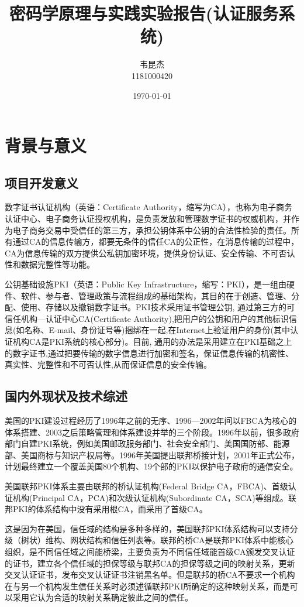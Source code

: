 \documentclass{ctexart}
\title{密码学原理与实践实验报告(认证服务系统)}
\author{韦昆杰\\1181000420}
\date{\today}
\begin{document}
\maketitle

\tableofcontents
\section{背景与意义}
\subsection{项目开发意义}
数字证书认证机构（英语：Certificate Authority，缩写为CA），也称为电子商务认证中心、电子商务认证授权机构，是负责发放和管理数字证书的权威机构，并作为电子商务交易中受信任的第三方，承担公钥体系中公钥的合法性检验的责任。所有通过CA的信息传输方，都要无条件的信任CA的公正性，在消息传输的过程中，CA为信息传输的双方提供公私钥加密环境，提供身份认证、安全传输、不可否认性和数据完整性等功能。

公钥基础设施PKI（英语：Public Key Infrastructure，缩写：PKI），是一组由硬件、软件、参与者、管理政策与流程组成的基础架构，其目的在于创造、管理、分配、使用、存储以及撤销数字证书。PKI技术采用证书管理公钥, 通过第三方的可信任机构—认证中心CA(Certificate Authority),把用户的公钥和用户的其他标识信息(如名称、E-mail、身份证号等)捆绑在一起,在Internet上验证用户的身份(其中认证机构CA是PKI系统的核心部分)。目前, 通用的办法是采用建立在PKI基础之上的数字证书,通过把要传输的数字信息进行加密和签名，保证信息传输的机密性、真实性、完整性和不可否认性,从而保证信息的安全传输。
\subsection{国内外现状及技术综述}
美国的PKI建设过程经历了1996年之前的无序、1996—2002年间以FBCA为核心的体系搭建、2003之后策略管理和体系建设并举的三个阶段。1996年以前，很多政府部门自建PKI系统，例如美国邮政服务部门、社会安全部门、美国国防部、能源部、美国商标与知识产权局等。1996年美国提出联邦桥接计划，2001年正式公布，计划最终建立一个覆盖美国80个机构、19个部的PKI以保护电子政府的通信安全。

美国联邦PKI体系主要由联邦的桥认证机构(Federal Bridge CA，FBCA)、首级认证机构(Principal CA，PCA)和次级认证机构(Subordinate CA，SCA)等组成。联邦PKI的体系结构中没有采用根CA，而采用了首级CA。

这是因为在美国，信任域的结构是多种多样的，美国联邦PKI体系结构可以支持分级（树状）维构、网状结构和信任列表等。联邦的桥CA是联邦PKI体系中能核心组织，是不同信任域之间能桥梁，主要负责为不同信任域能首级CA颁发交叉认证的证书，建立各个信任域的担保等级与联邦CA的担保等级之间的映射关系，更新交叉认证证书，发布交叉认证证书注销黑名单。但是联邦的桥CA不要求一个机构在与另一个机构发生信任关系时必须述循联邦PKI所确定的这种映射关系，而是可以采用它认为合适的映射关系确定彼此之间的信任。
\end{document}
